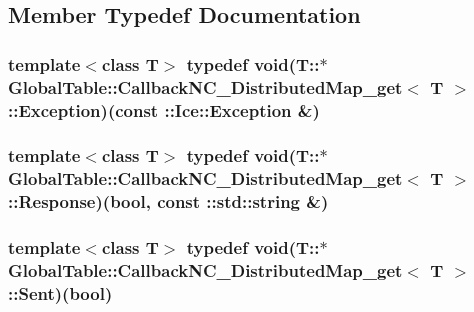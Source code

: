 \subsection{Member Typedef Documentation}
\hypertarget{class_global_table_1_1_callback_n_c___distributed_map__get_a126db6802d2d4a7493339ff578a55dbd}{
\subsubsection[{Exception}]{\setlength{\rightskip}{0pt plus 5cm}template$<$class T$>$ typedef void(T::$\ast$ {\bf GlobalTable::CallbackNC\_\-DistributedMap\_\-get}$<$ T $>$::{\bf Exception})(const ::Ice::Exception \&)}}
\label{class_global_table_1_1_callback_n_c___distributed_map__get_a126db6802d2d4a7493339ff578a55dbd}
\hypertarget{class_global_table_1_1_callback_n_c___distributed_map__get_a6b02991617c30d649770987cc7d959d9}{
\subsubsection[{Response}]{\setlength{\rightskip}{0pt plus 5cm}template$<$class T$>$ typedef void(T::$\ast$ {\bf GlobalTable::CallbackNC\_\-DistributedMap\_\-get}$<$ T $>$::{\bf Response})(bool, const ::std::string \&)}}
\label{class_global_table_1_1_callback_n_c___distributed_map__get_a6b02991617c30d649770987cc7d959d9}
\hypertarget{class_global_table_1_1_callback_n_c___distributed_map__get_adafce4dc5804233cd3b7653cf69f5be6}{
\subsubsection[{Sent}]{\setlength{\rightskip}{0pt plus 5cm}template$<$class T$>$ typedef void(T::$\ast$ {\bf GlobalTable::CallbackNC\_\-DistributedMap\_\-get}$<$ T $>$::{\bf Sent})(bool)}}
\label{class_global_table_1_1_callback_n_c___distributed_map__get_adafce4dc5804233cd3b7653cf69f5be6}

